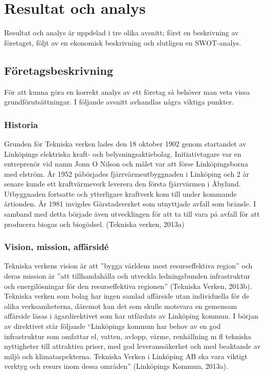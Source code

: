 \documentclass[10pt,a4paper]{article}
\begin{document}
\section{Resultat och analys}
Resultat och analys är uppdelad i tre olika avsnitt; först en beskrivning av
företaget, följt av en ekonomisk beskrivning och slutligen en SWOT-analys.

\subsection{Företagsbeskrivning}
För att kunna göra en korrekt analys av ett företag så behöver man veta vissa
grundförutsättningar. I följande avsnitt avhandlas några viktiga punkter. 

\subsubsection{Historia}
Grunden för Tekniska verken lades den 18 oktober 1902 genom startandet av
Linköpings elektriska kraft- och belysningsaktiebolag. Initiativtagare var en
entreprenör vid namn Jonn O Nilson och målet var att förse Linköpingsborna med
elström. År 1952 påbörjades fjärrvärmeutbyggnaden i Linköping och 2 år senare
kunde ett kraftvärmeverk leverera den första fjärrvärmen i Åbylund. Utbyggnaden
fortsatte och ytterligare kraftverk kom till under kommande årtionden. År 1981 
invigdes Gärstadsverket som utnyttjade avfall som bränsle. I samband med detta
började även utvecklingen för att ta till vara på avfall för att producera biogas 
och biogödsel. (Tekniska verken, 2013a) 

\subsubsection{Vision, mission, affärsidé}
Tekniska verkens vision är att ''bygga världens mest resurseffektiva
region'' och deras mission är ''att tillhandahålla och utveckla
ledningsbunden infrastruktur och energilösningar för den
resurseffektiva regionen'' (Tekniska Verken, 2013b). Tekniska verken som bolag har
ingen samlad affärside utan individuella för de olika verksamheterna, däremot kan det som skulle motsvara en gemensam affärside läsas  i ägardirektivet som har utfärdats av Linköping kommun. I början av direktivet står följande ``Linköpings kommun har behov av en god infrastruktur som omfattar el, vatten, avlopp, värme, renhållning m fl tekniska nyttigheter till attraktiva priser, med god leveranssäkerhet och med beaktande av miljö och klimataspekterna. Tekniska Verken i Linköping AB ska vara viktigt verktyg och resurs inom dessa områden'' (Linköpings Kommun, 2013a).
\end{document}
